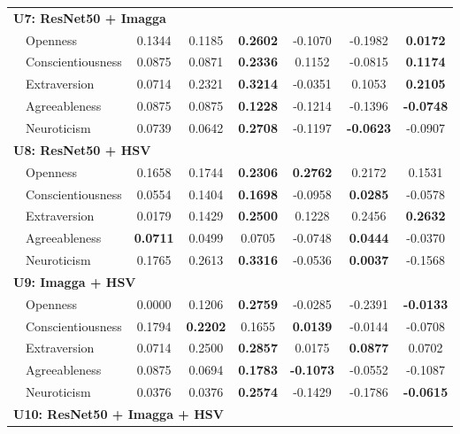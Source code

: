 \begin{longtable}{llcccccc}
\hline
\multicolumn{8}{l}{\textbf{U7: ResNet50 + Imagga}} \\

& Openness & 0.1344 & 0.1185 & \textbf{0.2602} & -0.1070 & -0.1982 & \textbf{0.0172} \\
& Conscientiousness & 0.0875 & 0.0871 & \textbf{0.2336} & 0.1152 & -0.0815 & \textbf{0.1174} \\
& Extraversion & 0.0714 & 0.2321 & \textbf{0.3214} & -0.0351 & 0.1053 & \textbf{0.2105} \\
& Agreeableness & 0.0875 & 0.0875 & \textbf{0.1228} & -0.1214 & -0.1396 & \textbf{-0.0748} \\
& Neuroticism & 0.0739 & 0.0642 & \textbf{0.2708} & -0.1197 & \textbf{-0.0623} & -0.0907 \\

\hline
\multicolumn{8}{l}{\textbf{U8: ResNet50 + HSV}} \\

& Openness & 0.1658 & 0.1744 & \textbf{0.2306} & \textbf{0.2762} & 0.2172 & 0.1531 \\
& Conscientiousness & 0.0554 & 0.1404 & \textbf{0.1698} & -0.0958 & \textbf{0.0285} & -0.0578 \\
& Extraversion & 0.0179 & 0.1429 & \textbf{0.2500} & 0.1228 & 0.2456 & \textbf{0.2632} \\
& Agreeableness & \textbf{0.0711} & 0.0499 & 0.0705 & -0.0748 & \textbf{0.0444} & -0.0370 \\
& Neuroticism & 0.1765 & 0.2613 & \textbf{0.3316} & -0.0536 & \textbf{0.0037} & -0.1568 \\

\hline
\multicolumn{8}{l}{\textbf{U9: Imagga + HSV}} \\

& Openness & 0.0000 & 0.1206 & \textbf{0.2759} & -0.0285 & -0.2391 & \textbf{-0.0133} \\
& Conscientiousness & 0.1794 & \textbf{0.2202} & 0.1655 & \textbf{0.0139} & -0.0144 & -0.0708 \\
& Extraversion & 0.0714 & 0.2500 & \textbf{0.2857} & 0.0175 & \textbf{0.0877} & 0.0702 \\
& Agreeableness & 0.0875 & 0.0694 & \textbf{0.1783} & \textbf{-0.1073} & -0.0552 & -0.1087 \\
& Neuroticism & 0.0376 & 0.0376 & \textbf{0.2574} & -0.1429 & -0.1786 & \textbf{-0.0615} \\

\hline
\multicolumn{8}{l}{\textbf{U10: ResNet50 + Imagga + HSV}} \\


\end{longtable}
